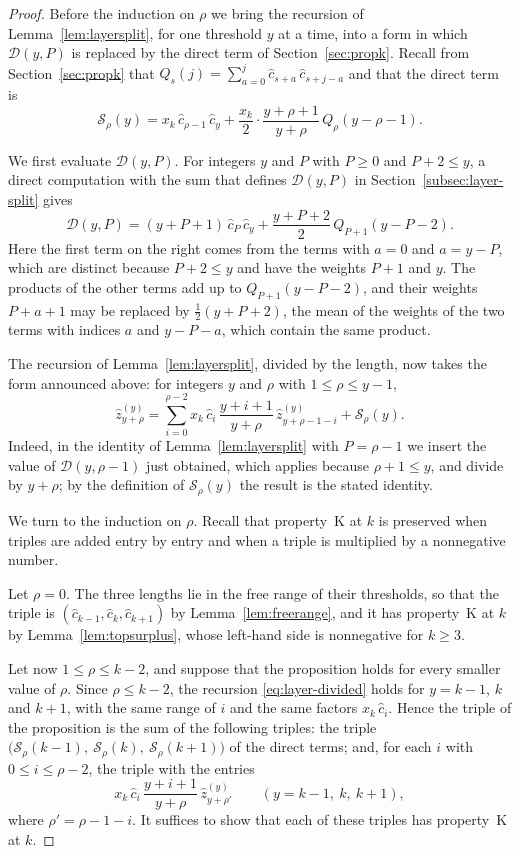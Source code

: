 \documentclass{amsart}
\theoremstyle{definition}
\theoremstyle{remark}
\numberwithin{equation}{section}
\begin{document}
\begin{proof}
Before the induction on $\rho$ we bring the recursion of Lemma~\ref{lem:layersplit}, for one threshold $y$ at a time, into a form in which $\mathcal D(y,P)$ is replaced by the direct term of Section~\ref{sec:propk}. Recall from Section~\ref{sec:propk} that $Q_s(j)=\sum_{a=0}^{j}\hat c_{s+a}\,\hat c_{s+j-a}$ and that the direct term is
\[
\mathcal S_\rho(y)=x_k\,\hat c_{\rho-1}\,\hat c_y+\frac{x_k}{2}\cdot\frac{y+\rho+1}{y+\rho}\,Q_\rho(y-\rho-1).
\]

We first evaluate $\mathcal D(y,P)$. For integers $y$ and $P$ with $P\ge 0$ and $P+2\le y$, a direct computation with the sum that defines $\mathcal D(y,P)$ in Section~\ref{subsec:layer-split} gives
\[
\mathcal D(y,P)=(y+P+1)\,\hat c_P\,\hat c_y+\frac{y+P+2}{2}\,Q_{P+1}(y-P-2).
\]
Here the first term on the right comes from the terms with $a=0$ and $a=y-P$, which are distinct because $P+2\le y$ and have the weights $P+1$ and $y$. The products of the other terms add up to $Q_{P+1}(y-P-2)$, and their weights $P+a+1$ may be replaced by $\frac12(y+P+2)$, the mean of the weights of the two terms with indices $a$ and $y-P-a$, which contain the same product.

The recursion of Lemma~\ref{lem:layersplit}, divided by the length, now takes the form announced above: for integers $y$ and $\rho$ with $1\le\rho\le y-1$,
\begin{equation}\label{eq:layer-divided}
\hat z^{(y)}_{y+\rho}=\sum_{i=0}^{\rho-2}x_k\,\hat c_i\,\frac{y+i+1}{y+\rho}\,\hat z^{(y)}_{y+\rho-1-i}+\mathcal S_\rho(y).
\end{equation}
Indeed, in the identity of Lemma~\ref{lem:layersplit} with $P=\rho-1$ we insert the value of $\mathcal D(y,\rho-1)$ just obtained, which applies because $\rho+1\le y$, and divide by $y+\rho$; by the definition of $\mathcal S_\rho(y)$ the result is the stated identity.

We turn to the induction on $\rho$. Recall that property~K at $k$ is preserved when triples are added entry by entry and when a triple is multiplied by a nonnegative number.

Let $\rho=0$. The three lengths lie in the free range of their thresholds, so that the triple is $(\hat c_{k-1},\hat c_k,\hat c_{k+1})$ by Lemma~\ref{lem:freerange}, and it has property~K at $k$ by Lemma~\ref{lem:topsurplus}, whose left-hand side is nonnegative for $k\ge 3$.

Let now $1\le\rho\le k-2$, and suppose that the proposition holds for every smaller value of $\rho$. Since $\rho\le k-2$, the recursion \eqref{eq:layer-divided} holds for $y=k-1$, $k$ and $k+1$, with the same range of $i$ and the same factors $x_k\,\hat c_i$. Hence the triple of the proposition is the sum of the following triples: the triple $\bigl(\mathcal S_\rho(k-1),\ \mathcal S_\rho(k),\ \mathcal S_\rho(k+1)\bigr)$ of the direct terms; and, for each $i$ with $0\le i\le\rho-2$, the triple with the entries
\[
x_k\,\hat c_i\,\frac{y+i+1}{y+\rho}\,\hat z^{(y)}_{y+\rho'}\qquad(y=k-1,\ k,\ k+1),
\]
where $\rho'=\rho-1-i$. It suffices to show that each of these triples has property~K at $k$.


\end{proof}
\end{document}
